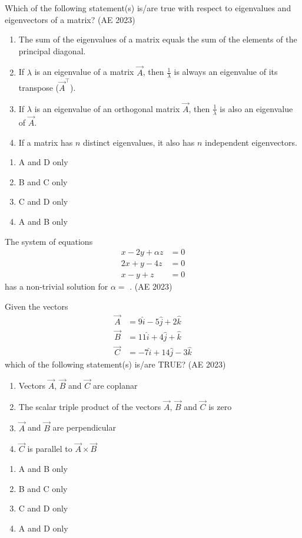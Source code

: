 \item Which of the following statement(s) is/are true with respect to eigenvalues and eigenvectors of a matrix?
	\hfill (AE 2023)
	\begin{enumerate}[label=\Alph*:]
\item The sum of the eigenvalues of a matrix equals the sum of the elements of the principal diagonal.
\item If $\lambda$ is an eigenvalue of a matrix $\vec{A}$, then $\frac{1}{\lambda}$ is always an eigenvalue of its transpose ($\vec{A}^{\top}$).
\item If $\lambda$ is an eigenvalue of an orthogonal matrix $\vec{A}$, then $\frac{1}{\lambda}$ is also an eigenvalue of $\vec{A}$.
\item If a matrix has $n$ distinct eigenvalues, it also has $n$ independent eigenvectors.
\end{enumerate}
\begin{multicols}{4}
\begin{enumerate}
\item A and D only
\item B and C only
\item C and D only
\item A and B only
\end{enumerate}
\end{multicols}
\item The system of equations 
\begin{align*}
x - 2y + \alpha z &= 0 \\
2x + y - 4z &= 0 \\
x - y + z &= 0
\end{align*}
has a non-trivial solution for $\alpha =$ \underline{\hspace{1.5cm}}. 
	\hfill (AE 2023)
\item Given the vectors 
\begin{align*}
\vec{A} &= 9\hat{i} - 5\hat{j} + 2\hat{k} \\
\vec{B} &= 11\hat{i} + 4\hat{j} + \hat{k} \\
\vec{C} &= -7\hat{i} + 14\hat{j} - 3\hat{k}
\end{align*}
which of the following statement(s) is/are TRUE?
	\hfill (AE 2023)
\begin{enumerate}
\item Vectors $\vec{A}$, $\vec{B}$ and $\vec{C}$ are coplanar
\item The scalar triple product of the vectors $\vec{A}$, $\vec{B}$ and $\vec{C}$ is zero
\item $\vec{A}$ and $\vec{B}$ are perpendicular
\item $\vec{C}$ is parallel to $\vec{A} \times \vec{B}$
\end{enumerate}
\begin{multicols}{4}
\begin{enumerate}
\item A and B only
\item B and C only
\item C and D only
\item A and D only
\end{enumerate}
\end{multicols}

